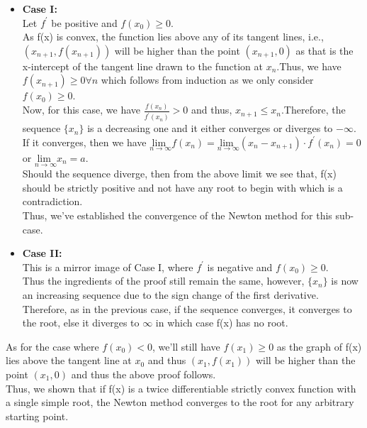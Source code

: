 \documentclass[letterpaper]{exam}
\begin{document}
\begin{questions}
\begin{solution}
\begin{itemize}
    \item \textbf{Case I:}\\
    Let $f^{'}$ be positive and $f(x_0) \geq 0$.\\
    As f(x) is convex, the function lies above any of its tangent lines, i.e., $(x_{n+1},f(x_{n+1}))$ will be higher than the point $(x_{n+1},0)$ as that is the x-intercept of the tangent line drawn to the function at $x_n$.Thus, we have $f(x_{n+1}) \geq 0 \forall n$ which follows from induction as we only consider $f(x_0) \geq 0$.\\
    Now, for this case, we have $\frac{f(x_n)}{f^{'}(x_n)} > 0$ and thus, $x_{n+1} \leq x_{n}$.Therefore, the sequence $\{x_n\}$ is a decreasing one and it either converges or diverges to $-\infty$.\\
    If it converges, then we have $\underset{n \rightarrow \infty}{\mbox{lim }} f(x_n) = \underset{n \rightarrow \infty}{\mbox{lim }} (x_n - x_{n+1})\cdot f^{'}(x_n) = 0$ or $\underset{n \rightarrow \infty}{\mbox{lim }} x_n = a$.\\
    Should the sequence diverge, then from the above limit we see that, f(x) should be strictly positive and not have any root to begin with which is a contradiction.\\
    Thus, we've established the convergence of the Newton method for this sub-case.
    \item \textbf{Case II:}\\
    This is a mirror image of Case I, where $f^{'}$ is negative and $f(x_0) \geq 0$.\\
    Thus the ingredients of the proof still remain the same, however, $\{x_n\}$ is now an increasing sequence due to the sign change of the first derivative.\\
    Therefore, as in the previous case, if the sequence converges, it converges to the root, else it diverges to $\infty$ in which case f(x) has no root.
\end{itemize}
As for the case where $f(x_0) < 0$, we'll still have $f(x_1) \geq 0$ as the graph of f(x) lies above the tangent line at $x_0$ and thus $(x_1,f(x_1))$ will be higher than the point $(x_1,0)$ and thus the above proof follows.\\
Thus, we shown that if f(x) is a twice differentiable strictly convex function with a single simple root, the Newton method converges to the root for any arbitrary starting point.
\end{solution}
\\

\end{questions}
\end{document}
